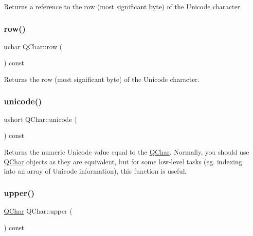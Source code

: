 Returns a reference to the row (most significant byte) of the Unicode character. \mbox{\label{class_q_char_a34a593cf210ef1ab09e09be78bf8ef3e}} 
\subsubsection{\texorpdfstring{row()}{row()}\hspace{0.1cm}{\footnotesize\ttfamily [2/2]}}
{\footnotesize\ttfamily uchar Q\+Char\+::row (\begin{DoxyParamCaption}{ }\end{DoxyParamCaption}) const\hspace{0.3cm}{\ttfamily [inline]}}

Returns the row (most significant byte) of the Unicode character. \mbox{\label{class_q_char_a0fd3d9a4b10d8f6482c5ebd8053b69a8}} 
\subsubsection{\texorpdfstring{unicode()}{unicode()}}
{\footnotesize\ttfamily ushort Q\+Char\+::unicode (\begin{DoxyParamCaption}{ }\end{DoxyParamCaption}) const\hspace{0.3cm}{\ttfamily [inline]}}

Returns the numeric Unicode value equal to the \mbox{\hyperlink{class_q_char}{Q\+Char}}. Normally, you should use \mbox{\hyperlink{class_q_char}{Q\+Char}} objects as they are equivalent, but for some low-\/level tasks (eg. indexing into an array of Unicode information), this function is useful. \mbox{\label{class_q_char_a4418e0d46d515231d620263cd7fd0c1f}} 
\subsubsection{\texorpdfstring{upper()}{upper()}}
{\footnotesize\ttfamily \mbox{\hyperlink{class_q_char}{Q\+Char}} Q\+Char\+::upper (\begin{DoxyParamCaption}{ }\end{DoxyParamCaption}) const}

